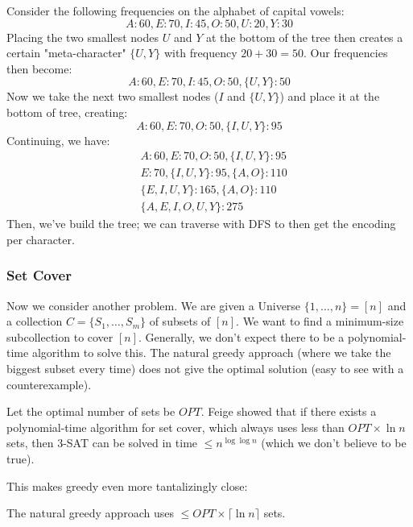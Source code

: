 \begin{example}
    Consider the following frequencies on the alphabet of capital vowels:
    \[ A: 60, E: 70, I: 45, O: 50, U: 20, Y: 30 \]
    Placing the two smallest nodes $U$ and $Y$ at the bottom of the tree then creates a certain "meta-character" $\{U, Y\}$ with frequency $20 + 30 = 50$. Our frequencies then become:
    \[ A: 60, E: 70, I:45, O: 50, \{U, Y\}: 50 \]
    Now we take the next two smallest nodes ($I$ and $\{U, Y\}$) and place it at the bottom of tree, creating:
    \[ A: 60, E: 70, O: 50, \{I, U, Y\}: 95 \]
    Continuing, we have:
    \begin{align*}
        &A: 60, E: 70, O: 50, \{I, U, Y\}: 95  \\
        &E: 70, \{I, U, Y\}: 95, \{A, O\}: 110 \\
        &\{E, I, U, Y\}: 165, \{A, O\}: 110 \\
        &\{A, E, I, O, U, Y\}: 275
    \end{align*}
    Then, we've build the tree; we can traverse with DFS to then get the encoding per character.
\end{example}

\subsubsection{Set Cover}
Now we consider another problem. We are given a Universe $\{1, \dots, n\} = [n]$ and a collection $C = \{S_1, \dots, S_m\}$ of subsets of $[n]$.
We want to find a minimum-size subcollection to cover $[n]$. Generally, we don't expect there to be a polynomial-time algorithm to solve this.
The natural greedy approach (where we take the biggest subset every time) does not give the optimal solution (easy to see with a counterexample).

Let the optimal number of sets be $OPT$.
Feige showed that if there exists a polynomial-time algorithm for set cover, which always uses less than $OPT \times \ln n$ sets, then
3-SAT can be solved in time $\leq n^{\log \log n}$ (which we don't believe to be true).

This makes greedy even more tantalizingly close:
\begin{theorem}
    The natural greedy approach uses $\leq OPT \times \lceil \ln n \rceil$ sets.
\end{theorem}

